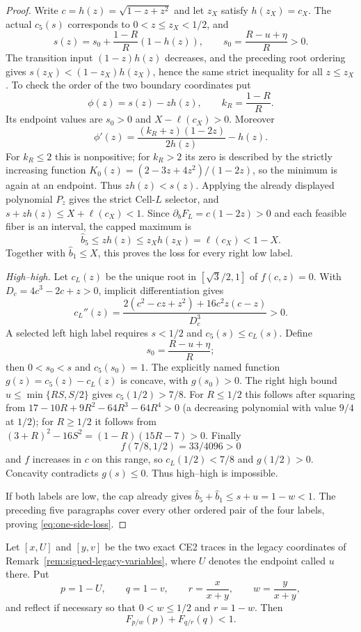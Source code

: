 \begin{proof}
Write $c=h(z)=\sqrt{1-z+z^2}$ and let $z_X$ satisfy $h(z_X)=c_X$.
The actual $c_5(s)$ corresponds to $0<z\le z_X<1/2$, and
\[
 s(z)=s_0+\frac{1-R}{R}(1-h(z)),\qquad
 s_0=\frac{R-u+\eta}{R}>0.
\]
The transition input $(1-z)h(z)$ decreases, and the preceding root ordering
gives $s(z_X)<(1-z_X)h(z_X)$, hence the same strict inequality for all
$z\le z_X$.  To check the order of the two boundary coordinates put
\[
 \phi(z)=s(z)-zh(z),\qquad k_R=\frac{1-R}{R}.
\]
Its endpoint values are $s_0>0$ and $X-\ell(c_X)>0$.  Moreover
\[
 \phi'(z)=\frac{(k_R+z)(1-2z)}{2h(z)}-h(z).
\]
For $k_R\le2$ this is nonpositive; for $k_R>2$ its zero is described by the
strictly increasing function
$K_0(z)=(2-3z+4z^2)/(1-2z)$, so the minimum is again at an endpoint.
Thus $zh(z)<s(z)$.  Applying the already displayed polynomial $P_z$ gives
the strict Cell-$L$ selector, and
$s+zh(z)\le X+\ell(c_X)<1$.  Since
$\partial_bF_L=c(1-2z)>0$ and each feasible fiber is an interval, the capped
maximum is
\[
 \widehat b_5\le zh(z)\le z_Xh(z_X)=\ell(c_X)<1-X.
\]
Together with $\widehat b_1\le X$, this proves the loss for every right low label.

\smallskip\noindent
\emph{High--high.}
Let $c_L(z)$ be the unique root in $[\sqrt3/2,1]$ of $f(c,z)=0$.
With $D_c=4c^3-2c+z>0$, implicit differentiation gives
\[
 c_L''(z)=
 \frac{2(c^2-cz+z^2)+16c^2z(c-z)}{D_c^3}>0.
\]
A selected left high label requires $s<1/2$ and $c_5(s)\le c_L(s)$.
Define
\[
 s_0=\frac{R-u+\eta}{R};
\]
then $0<s_0<s$ and $c_5(s_0)=1$.  The explicitly named function
$g(z)=c_5(z)-c_L(z)$ is concave, with $g(s_0)>0$.  The right high bound
$u\le\min\{RS,S/2\}$ gives $c_5(1/2)>7/8$.  For $R\le1/2$ this follows
after squaring from
$17-10R+9R^2-64R^3-64R^4>0$ (a decreasing polynomial with value $9/4$ at
$1/2$); for $R\ge1/2$ it follows from
$(3+R)^2-16S^2=(1-R)(15R-7)>0$.  Finally
\[
 f(7/8,1/2)=33/4096>0
\]
and $f$ increases in $c$ on this range, so $c_L(1/2)<7/8$ and
$g(1/2)>0$.  Concavity contradicts $g(s)\le0$.  Thus high--high is
impossible.

If both labels are low, the cap already gives
$\widehat b_5+\widehat b_1\le s+u=1-w<1$.  The preceding five paragraphs cover every other
ordered pair of the four labels, proving \eqref{eq:one-side-loss}.
\end{proof}

\begin{lemma}
\label{lem:two-endpoint-capped-loss}
Let $[x,U]$ and $[y,v]$ be the two exact CE2 traces in the legacy
coordinates of Remark~\ref{rem:signed-legacy-variables}, where $U$ denotes
the endpoint called $u$ there.  Put
\[
 p=1-U,\qquad q=1-v,\qquad
 r=\frac{x}{x+y},\qquad w=\frac{y}{x+y},
\]
and reflect if necessary so that $0<w\le1/2$ and $r=1-w$.  Then
\begin{equation}
 F_{p/w}(p)+F_{q/r}(q)<1.
 \label{eq:two-endpoint-loss}
\end{equation}
\end{lemma}

